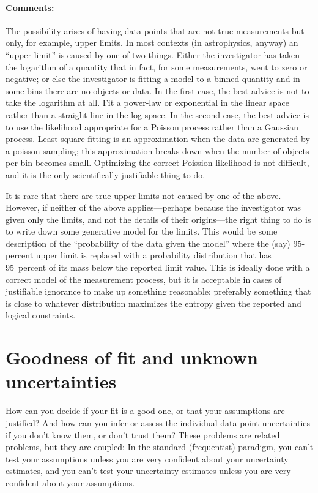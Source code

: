 \documentclass[12pt,twoside]{article}
\newcommand{\commentsname}{Comments}
\newcounter{problem}
\newenvironment{comments}{\paragraph{\commentsname:}}{}
\begin{document}
\begin{comments}
The possibility arises of having data points that are not true
measurements but only, for example, upper limits.  In most contexts
(in astrophysics, anyway) an ``upper limit'' is caused by one of two
things.  Either the investigator has taken the logarithm of a quantity
that in fact, for some measurements, went to zero or negative; or else
the investigator is fitting a model to a binned quantity and in some
bins there are no objects or data.  In the first case, the best advice
is not to take the logarithm at all.  Fit a power-law or exponential
in the linear space rather than a straight line in the log space.  In
the second case, the best advice is to use the likelihood appropriate
for a Poisson process rather than a Gaussian process.  Least-square
fitting is an approximation when the data are generated by a poisson
sampling; this approximation breaks down when the number of objects
per bin becomes small.  Optimizing the correct Poission likelihood is
not difficult, and it is the only scientifically justifiable thing to
do.

It is rare that there are true upper limits not caused by one of the
above.  However, if neither of the above applies---perhaps because the
investigator was given only the limits, and not the details of their
origins---the right thing to do is to write down some generative model
for the limits.  This would be some description of the ``probability
of the data given the model'' where the (say) 95-percent upper limit
is replaced with a probability distribution that has 95~percent of its
mass below the reported limit value.  This is ideally done with a
correct model of the measurement process, but it is acceptable in
cases of justifiable ignorance to make up something reasonable;
preferably something that is close to whatever distribution maximizes
the entropy given the reported and logical constraints.
\end{comments}

\section{Goodness of fit and unknown uncertainties}\label{sec:goodness}

How can you decide if your fit is a good one, or that your assumptions
are justified?  And how can you infer or assess the individual
data-point uncertainties if you don't know them, or don't trust them?
These problems are related problems, but they are coupled: In the
standard (frequentist) paradigm, you can't test your assumptions
unless you are very confident about your uncertainty estimates, and
you can't test your uncertainty estimates unless you are very
confident about your assumptions.
\end{document}
